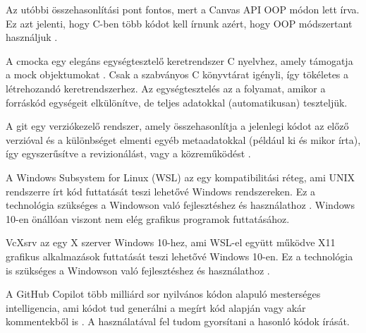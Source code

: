 Az utóbbi összehasonlítási pont fontos, mert a Canvas API OOP módon lett írva. Ez azt jelenti, hogy C-ben több kódot kell írnunk azért, hogy OOP módszertant használjuk \cite{c-oop}.


A cmocka egy elegáns egységtesztelő keretrendszer C nyelvhez, amely támogatja a mock objektumokat \cite{cmocka}. Csak a szabványos C könyvtárat igényli, így tökéletes a létrehozandó keretrendszerhez. Az egységtesztelés az a folyamat, amikor a forráskód egységeit elkülönítve, de teljes adatokkal (automatikusan) teszteljük.


A git egy verziókezelő rendszer, amely összehasonlítja a jelenlegi kódot az előző verzióval és a különbséget elmenti egyéb metaadatokkal (például ki és mikor írta), így egyszerűsítve a revizionálást, vagy a közreműködést \cite{git}.


A Windows Subsystem for Linux (WSL) az egy kompatibilitási réteg, ami UNIX rendszerre írt kód futtatását teszi lehetővé Windows rendszereken. Ez a technológia szükséges a Windowson való fejlesztéshez és használathoz \cite{wsl}. Windows 10-en önállóan viszont nem elég grafikus programok futtatásához.


VcXsrv az egy X szerver Windows 10-hez, ami WSL-el együtt működve X11 grafikus alkalmazások futtatását teszi lehetővé Windows 10-en. Ez a technológia is szükséges a Windowson való fejlesztéshez és használathoz \cite{vcxsrv}.


A GitHub Copilot több milliárd sor nyilvános kódon alapuló mesterséges intelligencia, ami kódot tud generálni a megírt kód alapján vagy akár kommentekből is \cite{github-copilot}. A használatával fel tudom gyorsítani a hasonló kódok írását.